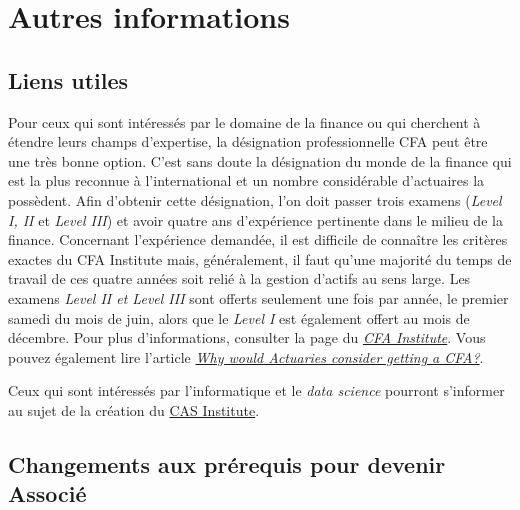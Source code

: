 \section*{Autres informations}
\label{sec:autres}

\subsection*{Liens utiles}
\label{subsec:liens}
Pour ceux qui sont intéressés par le domaine de la finance ou qui cherchent à étendre leurs champs d'expertise, la désignation professionnelle CFA peut être une très bonne option. C'est sans doute la désignation du monde de la finance qui est la plus reconnue à l'international et un nombre considérable d'actuaires la possèdent. Afin d'obtenir cette désignation, l'on doit passer trois examens (\emph{Level I, II} et \emph{Level III}) et avoir quatre ans d'expérience pertinente dans le milieu de la finance. Concernant l'expérience demandée, il est difficile de connaître les critères exactes du CFA Institute mais, généralement, il faut qu'une majorité du temps de travail de ces quatre années soit relié à la gestion d'actifs au sens large. Les examens \emph{Level II \emph{et} Level III} sont offerts seulement une fois par année, le premier samedi du mois de juin, alors que le \emph{Level I} est également offert au mois de décembre. Pour plus d'informations, consulter la page du \href{https://www.cfainstitute.org/Pages/index.aspx}{\emph{CFA Institute}}. Vous pouvez également lire l'article \href{http://blog.coachingactuaries.com/why-would-actuaries-consider-getting-a-cfa/}{\emph{Why would Actuaries consider getting a CFA?}}.\vspace{\baselineskip}


Ceux qui sont intéressés par l'informatique et le \emph{data science} pourront s'informer au sujet de la création du \href{http://www.casact.org/press/index.cfm?fa=viewArticle&articleID=3083}{CAS Institute}.\vspace{\baselineskip} 


\newpage
\subsection*{Changements aux prérequis pour devenir Associé}
\label{subsec:changeasa}
